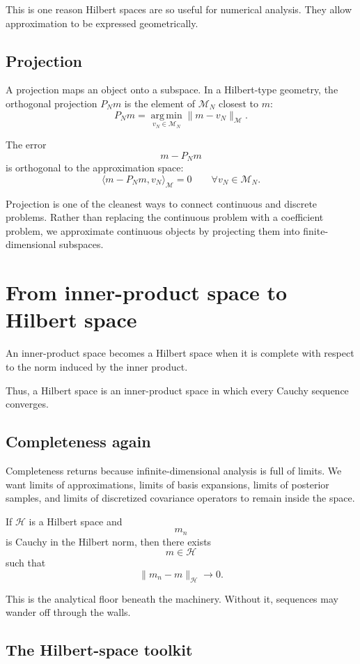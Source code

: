 \documentclass[11pt,a4paper]{book}
\newcommand{\M}{\mathcal{M}}      %
\newcommand{\Hh}{\mathcal{H}}     %
\begin{document}
This is one reason Hilbert spaces are so useful for numerical analysis. They
allow approximation to be expressed geometrically.

\subsection{Projection}

A projection maps an object onto a subspace. In a Hilbert-type geometry, the
orthogonal projection $P_Nm$ is the element of $\M_N$ closest to $m$:
\[
    P_Nm
    =
    \operatorname*{arg\,min}_{v_N\in\M_N}
    \|m-v_N\|_{\M}.
\]

The error
\[
    m-P_Nm
\]
is orthogonal to the approximation space:
\[
    \langle m-P_Nm,v_N\rangle_{\M}=0
    \qquad
    \forall v_N\in\M_N.
\]

Projection is one of the cleanest ways to connect continuous and discrete
problems. Rather than replacing the continuous problem with a coefficient
problem, we approximate continuous objects by projecting them into
finite-dimensional subspaces.

\section{From inner-product space to Hilbert space}

An inner-product space becomes a Hilbert space when it is complete with respect
to the norm induced by the inner product.

Thus, a Hilbert space is an inner-product space in which every Cauchy sequence
converges.

\subsection{Completeness again}

Completeness returns because infinite-dimensional analysis is full of limits.
We want limits of approximations, limits of basis expansions, limits of
posterior samples, and limits of discretized covariance operators to remain
inside the space.

If $\Hh$ is a Hilbert space and
\[
    m_n
\]
is Cauchy in the Hilbert norm, then there exists
\[
    m\in\Hh
\]
such that
\[
    \|m_n-m\|_{\Hh}\to 0.
\]

This is the analytical floor beneath the machinery. Without it, sequences may
wander off through the walls.

\subsection{The Hilbert-space toolkit}
\end{document}
